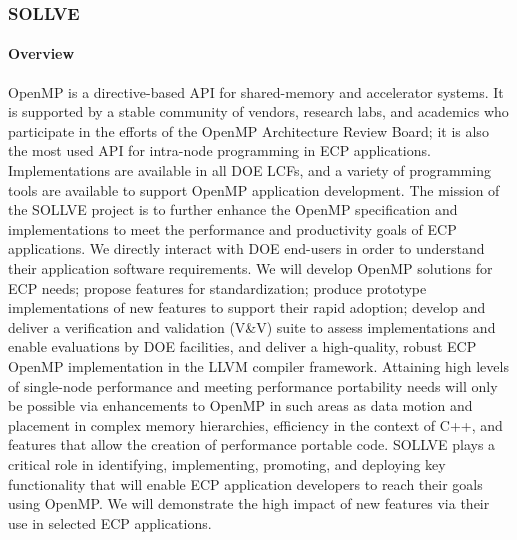 \subsubsection{SOLLVE} \label{subsubsect:sollve}


\paragraph{Overview} 

OpenMP is a   directive-based API for shared-memory and accelerator systems. It
is supported by a stable community of vendors, research labs, and academics who
participate in the efforts of the  OpenMP Architecture Review Board; it   is
also the most used API for intra-node programming in ECP applications.
Implementations are available in all DOE LCFs, and a variety of programming
tools are available to support OpenMP application development. The mission of
the SOLLVE project is to further enhance the OpenMP specification and
implementations to meet the performance and productivity goals of ECP
applications. We directly interact with DOE end-users in order to understand
their application software requirements. We will develop OpenMP solutions for
ECP needs; propose features for standardization; produce prototype
implementations of new features to support their rapid adoption; develop and
deliver a verification and validation (V\&V) suite to assess implementations and
enable evaluations by DOE  facilities, and deliver a high-quality,  robust ECP
OpenMP implementation in the LLVM compiler framework. Attaining high levels of
single-node performance and meeting performance portability needs will only be
possible via enhancements to OpenMP in such areas as data motion and placement
in complex memory  hierarchies, efficiency in the context of C++,  and features
that allow the creation of performance portable code. SOLLVE plays a critical
role in identifying, implementing, promoting, and deploying key functionality
that will enable ECP application developers to reach their goals using OpenMP.
We will demonstrate the high impact of new features via their use in selected
ECP applications.

